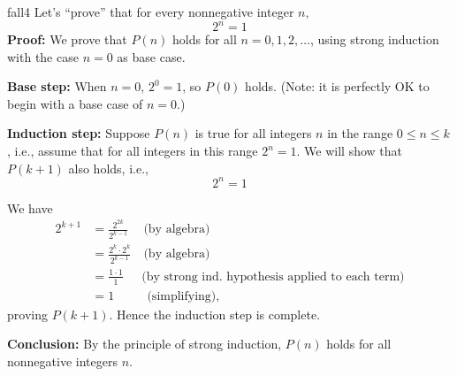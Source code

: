 

\begin{example}{fall4} Let's ``prove'' that for every nonnegative integer $n$, 
\[
\tag{$P(n)$} 2^n=1
\]
\textbf{Proof:} We prove that $P(n)$ holds for all $n=0,1,2,\dots$, using
strong induction with the case $n=0$ as base case.

\textbf{Base step:} When $n=0$, $2^0=1$, so $P(0)$ holds. (Note: it is perfectly OK to begin with a base case of $n=0$.)

\textbf{Induction step:} 
Suppose $P(n)$ is true for all integers $n$ in the range $0\le n\le k$, i.e.,
assume that for all integers in this range $2^n=1$.
We will show that $P(k+1)$ also holds, i.e., 
\[
\tag{$P(k+1)$} 2^n=1
\]

We have
\begin{align*}
2^{k+1}&=\frac{2^{2k}}{2^{k-1}}
\quad~\text{(by algebra)}
\\
&=\frac{2^k\cdot 2^k}{2^{k-1}}
\quad\text{(by algebra)}
\\
&=\frac{1\cdot 1}{1}
\quad~~\text{(by strong ind. hypothesis applied to each term)}
\\
&=1
\qquad~~~\text{(simplifying),}
\end{align*}
proving $P(k+1)$. Hence the induction step is complete.

\textbf{Conclusion:} By the principle of strong induction, $P(n)$ holds for all
nonnegative integers $n$.
\end{example}


